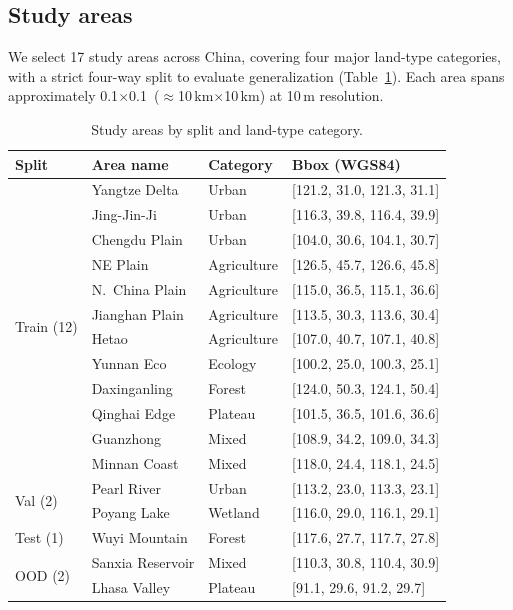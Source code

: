 \documentclass{article}
\begin{document}
\subsection{Study areas}

We select 17 study areas across China, covering four major land-type categories, with a strict four-way split to evaluate generalization (Table~\ref{tab:areas}). Each area spans approximately 0.1\textdegree$\times$0.1\textdegree\ ($\approx$10\,km$\times$10\,km) at 10\,m resolution.

\begin{table}[htbp]
\centering
\caption{Study areas by split and land-type category.}
\label{tab:areas}
\begin{tabular}{llll}
\toprule
Split & Area name & Category & Bbox (WGS84) \\
\midrule
\multirow{12}{*}{Train (12)} & Yangtze Delta & Urban & [121.2, 31.0, 121.3, 31.1] \\
 & Jing-Jin-Ji & Urban & [116.3, 39.8, 116.4, 39.9] \\
 & Chengdu Plain & Urban & [104.0, 30.6, 104.1, 30.7] \\
 & NE Plain & Agriculture & [126.5, 45.7, 126.6, 45.8] \\
 & N.~China Plain & Agriculture & [115.0, 36.5, 115.1, 36.6] \\
 & Jianghan Plain & Agriculture & [113.5, 30.3, 113.6, 30.4] \\
 & Hetao & Agriculture & [107.0, 40.7, 107.1, 40.8] \\
 & Yunnan Eco & Ecology & [100.2, 25.0, 100.3, 25.1] \\
 & Daxinganling & Forest & [124.0, 50.3, 124.1, 50.4] \\
 & Qinghai Edge & Plateau & [101.5, 36.5, 101.6, 36.6] \\
 & Guanzhong & Mixed & [108.9, 34.2, 109.0, 34.3] \\
 & Minnan Coast & Mixed & [118.0, 24.4, 118.1, 24.5] \\
\midrule
\multirow{2}{*}{Val (2)} & Pearl River & Urban & [113.2, 23.0, 113.3, 23.1] \\
 & Poyang Lake & Wetland & [116.0, 29.0, 116.1, 29.1] \\
\midrule
Test (1) & Wuyi Mountain & Forest & [117.6, 27.7, 117.7, 27.8] \\
\midrule
\multirow{2}{*}{OOD (2)} & Sanxia Reservoir & Mixed & [110.3, 30.8, 110.4, 30.9] \\
 & Lhasa Valley & Plateau & [91.1, 29.6, 91.2, 29.7] \\
\bottomrule
\end{tabular}
\end{table}
\end{document}
